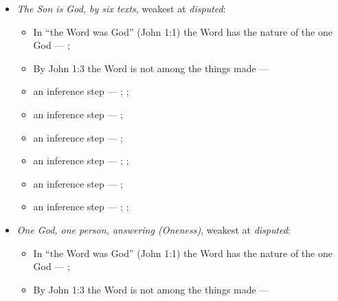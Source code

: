 \documentclass[11pt,paper=\testimonypaper,DIV=13,parskip=false]{scrartcl}
\begin{document}
\begin{itemize}
\item \emph{The Son is God, by six texts}, weakest at \emph{disputed}:
\begin{itemize}
\item In “the Word was God” (John 1:1) the Word has the nature of the one God --- \cite{harner-qualitative-anarthrous-1973}; \cite[3, The Triune God]{kibbey-living-systematic-theology-2026}
\item By John 1:3 the Word is not among the things made --- \cite[Tractates on John I.11]{schaff-nicene-post-nicene-fathers-1-7}
\item an inference step --- \cite[3, The Triune God]{kibbey-living-systematic-theology-2026}; \cite[ch. 4, Conclusion]{bernard-oneness-of-god-1983}; \cite[17--19]{buzzard-caveat-lector-2001}
\item an inference step --- \cite[Tractates on John 121.5]{schaff-nicene-post-nicene-fathers-1-7}; \cite[71]{metzger-jehovahs-witnesses-jesus-christ-1953}
\item an inference step --- \cite[on Hebrews 1:8]{calvin-hebrews-1853}; \cite{new-world-translation-2013}
\item an inference step --- \cite[23--24]{sharp-remarks-definitive-article-1803}; \cite[79]{metzger-jehovahs-witnesses-jesus-christ-1953}; \cite{new-world-translation-2013}
\item an inference step --- \cite[on Romans 9:5]{calvin-romans-1849}; \cite{new-world-translation-2013}
\item an inference step --- \cite[on Philippians 2:9–10]{calvin-commentaries-philippians}; \cite[on Romans 14:11]{calvin-romans-1849}; \cite{new-world-translation-2013}
\end{itemize}
\item \emph{One God, one person, answering (Oneness)}, weakest at \emph{disputed}:
\begin{itemize}
\item In “the Word was God” (John 1:1) the Word has the nature of the one God --- \cite{harner-qualitative-anarthrous-1973}; \cite[3, The Triune God]{kibbey-living-systematic-theology-2026}
\item By John 1:3 the Word is not among the things made --- \cite[Tractates on John I.11]{schaff-nicene-post-nicene-fathers-1-7}

\end{itemize}
\end{itemize}
\end{document}

